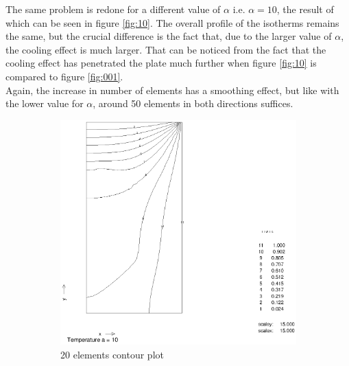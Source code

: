 \documentclass[10pt,a4paper]{article}
\begin{document}
The same problem is redone for a different value of $\alpha$ i.e. $\alpha = 10$, the result of which can be seen in figure \ref{fig:10}. The overall profile of the isotherms remains the same, but the crucial difference is the fact that, due to the larger value of $\alpha$, the cooling effect is much larger. That can be noticed from the fact that the cooling effect has penetrated the plate much further when figure \ref{fig:10} is compared to figure \ref{fig:001}.\\
Again, the increase in number of elements has a smoothing effect, but like with the lower value for $\alpha$, around 50 elements in both directions suffices.
\newpage
\begin{figure}[h]
\centering
        \begin{subfigure}[b]{0.45\textwidth}
                \includegraphics[width=\textwidth]{cont_a10_20el}
                \caption{20 elements contour plot}
                \label{fig:cont_a10_20el}
        \end{subfigure}
        ~
        \begin{subfigure}[b]{0.45\textwidth}

\end{subfigure}
\end{figure}
\end{document}
